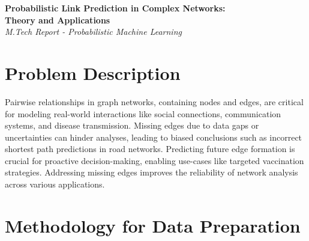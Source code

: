 \documentclass[11pt,a4paper]{article}
\begin{document}
\begin{center}
    \LARGE\textbf{Probabilistic Link Prediction in Complex Networks:\\ Theory and Applications}\vspace{0.5em}\\
    \large\textit{M.Tech Report - Probabilistic Machine Learning}
\end{center}
\vspace{1em}

\section{Problem Description}
Pairwise relationships in graph networks, containing nodes and edges, are critical for modeling real-world interactions like social connections, communication systems, and disease transmission. Missing edges due to data gaps or uncertainties can hinder analyses, leading to biased conclusions such as incorrect shortest path predictions in road networks. Predicting future edge formation is crucial for proactive decision-making, enabling use-cases like targeted vaccination strategies. Addressing missing edges improves the reliability of network analysis across various applications.



\section{Methodology for Data Preparation}
\end{document}
